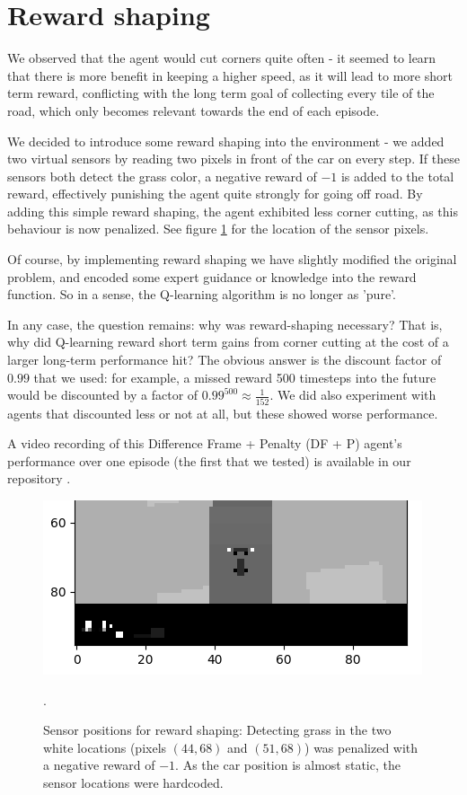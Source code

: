 \documentclass[a4paper, 11pt, conference]{ieeeconf}      %
\begin{document}
\section{Reward shaping}

We observed that the agent would cut corners quite often - it seemed to learn that there is more benefit in keeping a higher speed, as it will lead to more short term reward, conflicting with the long term goal of collecting every tile of the road, which only becomes relevant towards the end of each episode.

We decided to introduce some reward shaping into the environment - we added two virtual sensors by reading two pixels in front of the car on every step. If these sensors both detect the grass color, a negative reward of $-1$ is added to the total reward, effectively punishing the agent quite strongly for going off road. By adding this simple reward shaping, the agent exhibited less corner cutting, as this behaviour is now penalized. See figure \ref{fig:reward_shaping} for the location of the sensor pixels.

Of course, by implementing reward shaping we have slightly modified the original problem, and encoded some expert guidance or knowledge into the reward function. So in a sense, the Q-learning algorithm is no longer as 'pure'. 

In any case, the question remains: why was reward-shaping necessary? That is, why did Q-learning reward short term gains from corner cutting at the cost of a larger long-term performance hit? The obvious answer is the discount factor of $0.99$ that we used: for example, a missed reward 500 timesteps into the future would be discounted by a factor of $0.99^{500} \approx \frac{1}{152}$. We did also experiment with agents that discounted less or not at all, but these showed worse performance.

A video recording of this Difference Frame + Penalty (DF + P) agent's performance over one episode (the first that we tested) is available in our repository \cite{repo}.

\begin{figure}
  \includegraphics[width=\linewidth]{figs/reward_shaping_closeup.png}
  \caption{Sensor positions for reward shaping: Detecting grass in the two white locations (pixels $(44, 68)$ and $(51,68)$) was penalized with a negative reward of $-1$. As the car position is almost static, the sensor locations were hardcoded.}.
  \label{fig:reward_shaping}
\end{figure}
\end{document}
